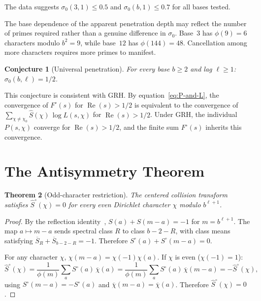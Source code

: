 \documentclass[12pt]{amsart}
\newtheorem{theorem}{Theorem}
\newtheorem{conjecture}[theorem]{Conjecture}
\theoremstyle{definition}
\theoremstyle{remark}
\begin{document}
The data suggests $\sigma_0(3, 1) \le 0.5$ and
$\sigma_0(b, 1) \le 0.7$ for all bases tested.

The base dependence of the apparent penetration depth
may reflect the number of primes required rather than
a genuine difference in $\sigma_0$. Base~$3$ has
$\phi(9) = 6$ characters modulo $b^2 = 9$, while
base~$12$ has $\phi(144) = 48$. Cancellation among
more characters requires more primes to manifest.

\begin{conjecture}[Universal penetration]\label{conj:penetration}
For every base $b \ge 2$ and lag $\ell \ge 1$:
$\sigma_0(b, \ell) = 1/2$.
\end{conjecture}

This conjecture is consistent with GRH. By
equation~\eqref{eq:P-and-L}, the convergence of
$F^{\circ}(s)$ for $\operatorname{Re}(s) > 1/2$ is
equivalent to the convergence of
$\sum_{\chi \ne \chi_0} \hat{S}(\chi)\, \log L(s, \chi)$
for $\operatorname{Re}(s) > 1/2$. Under GRH, the
individual $P(s, \chi)$ converge for
$\operatorname{Re}(s) > 1/2$, and the finite sum
$F^{\circ}(s)$ inherits this convergence.

\section{The Antisymmetry Theorem}

\begin{theorem}[Odd-character restriction]\label{thm:odd}
The centered collision transform satisfies
$\hat{S}^{\circ}(\chi) = 0$ for every even Dirichlet
character $\chi$ modulo $b^{\ell+1}$.
\end{theorem}

\begin{proof}
By the reflection identity~\cite{paper16},
$S(a) + S(m{-}a) = -1$ for $m = b^{\ell+1}$. The map
$a \mapsto m - a$ sends spectral class $R$ to class
$b - 2 - R$, with class means satisfying
$\overline{S}_R + \overline{S}_{b-2-R} = -1$. Therefore
$S^{\circ}(a) + S^{\circ}(m{-}a) = 0$.

For any character $\chi$, $\chi(m{-}a) = \chi(-1)\chi(a)$.
If $\chi$ is even ($\chi(-1) = 1$):
\[
\hat{S}^{\circ}(\chi) = \frac{1}{\phi(m)}
\sum_a S^{\circ}(a)\, \overline{\chi}(a)
= \frac{1}{\phi(m)}
\sum_a S^{\circ}(a)\, \overline{\chi}(m{-}a)
= -\hat{S}^{\circ}(\chi),
\]
using $S^{\circ}(m{-}a) = -S^{\circ}(a)$ and
$\overline{\chi}(m{-}a) = \overline{\chi}(a)$.
Therefore $\hat{S}^{\circ}(\chi) = 0$.
\end{proof}
\end{document}
